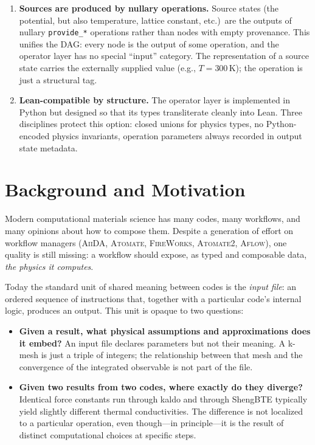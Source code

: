 \documentclass[11pt,a4paper]{article}
\begin{document}
\begin{enumerate}[leftmargin=2.5em, itemsep=0.4em]
  \item \textbf{Sources are produced by nullary operations.} Source states (the
        potential, but also temperature, lattice constant, etc.)\ are the outputs of
        nullary \texttt{provide\_*} operations rather than nodes with empty provenance.
        This unifies the DAG: every node is the output of some operation, and the
        operator layer has no special ``input'' category. The representation of a source
        state carries the externally supplied value (e.g., $T = 300\,\mathrm{K}$); the
        operation is just a structural tag.

  \item \textbf{Lean-compatible by structure.} The operator layer is implemented in Python
        but designed so that its types transliterate cleanly into Lean. Three disciplines
        protect this option: closed unions for physics types, no Python-encoded physics
        invariants, operation parameters always recorded in output state metadata.
       
\end{enumerate}

\bigskip


\section{Background and Motivation}
\label{sec:motivation}

Modern computational materials science has many codes, many workflows, and many opinions about how
to compose them. Despite a generation of effort on workflow managers (\textsc{AiiDA}, \textsc{Atomate},
\textsc{FireWorks}, \textsc{Atomate2}, \textsc{Aflow}), one quality is still missing: a workflow
should expose, as typed and composable data, \emph{the physics it computes}.

Today the standard unit of shared meaning between codes is the \emph{input file}: an ordered
sequence of instructions that, together with a particular code's internal logic, produces an
output. This unit is opaque to two questions:

\begin{itemize}[leftmargin=2em]
  \item \textbf{Given a result, what physical assumptions and approximations does it embed?}
        An input file declares parameters but not their meaning. A k-mesh is just a triple of
        integers; the relationship between that mesh and the convergence of the integrated
        observable is not part of the file.
  \item \textbf{Given two results from two codes, where exactly do they diverge?} Identical force
        constants run through kaldo and through ShengBTE typically yield slightly different
        thermal conductivities. The difference is not localized to a particular operation, even
        though---in principle---it is the result of distinct computational choices at specific
        steps.
\end{itemize}
\end{document}
